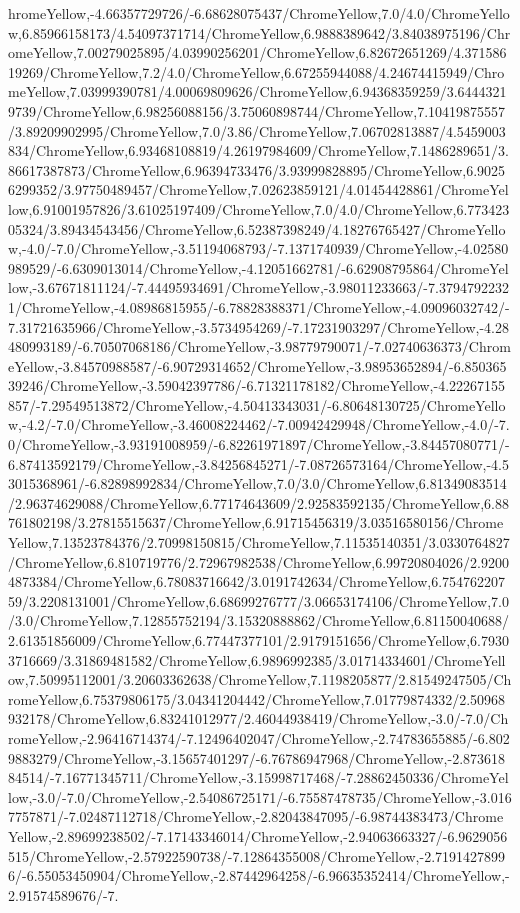 {\begin{tikzternal}
hromeYellow,-4.66357729726/-6.68628075437/ChromeYellow,7.0/4.0/ChromeYellow,6.85966158173/4.54097371714/ChromeYellow,6.9888389642/3.84038975196/ChromeYellow,7.00279025895/4.03990256201/ChromeYellow,6.82672651269/4.37158619269/ChromeYellow,7.2/4.0/ChromeYellow,6.67255944088/4.24674415949/ChromeYellow,7.03999390781/4.00069809626/ChromeYellow,6.94368359259/3.64443219739/ChromeYellow,6.98256088156/3.75060898744/ChromeYellow,7.10419875557/3.89209902995/ChromeYellow,7.0/3.86/ChromeYellow,7.06702813887/4.5459003834/ChromeYellow,6.93468108819/4.26197984609/ChromeYellow,7.1486289651/3.86617387873/ChromeYellow,6.96394733476/3.93999828895/ChromeYellow,6.90256299352/3.97750489457/ChromeYellow,7.02623859121/4.01454428861/ChromeYellow,6.91001957826/3.61025197409/ChromeYellow,7.0/4.0/ChromeYellow,6.77342305324/3.89434543456/ChromeYellow,6.52387398249/4.18276765427/ChromeYellow,-4.0/-7.0/ChromeYellow,-3.51194068793/-7.1371740939/ChromeYellow,-4.02580989529/-6.6309013014/ChromeYellow,-4.12051662781/-6.62908795864/ChromeYellow,-3.67671811124/-7.44495934691/ChromeYellow,-3.98011233663/-7.37947922321/ChromeYellow,-4.08986815955/-6.78828388371/ChromeYellow,-4.09096032742/-7.31721635966/ChromeYellow,-3.5734954269/-7.17231903297/ChromeYellow,-4.28480993189/-6.70507068186/ChromeYellow,-3.98779790071/-7.02740636373/ChromeYellow,-3.84570988587/-6.90729314652/ChromeYellow,-3.98953652894/-6.85036539246/ChromeYellow,-3.59042397786/-6.71321178182/ChromeYellow,-4.22267155857/-7.29549513872/ChromeYellow,-4.50413343031/-6.80648130725/ChromeYellow,-4.2/-7.0/ChromeYellow,-3.46008224462/-7.00942429948/ChromeYellow,-4.0/-7.0/ChromeYellow,-3.93191008959/-6.82261971897/ChromeYellow,-3.84457080771/-6.87413592179/ChromeYellow,-3.84256845271/-7.08726573164/ChromeYellow,-4.53015368961/-6.82898992834/ChromeYellow,7.0/3.0/ChromeYellow,6.81349083514/2.96374629088/ChromeYellow,6.77174643609/2.92583592135/ChromeYellow,6.88761802198/3.27815515637/ChromeYellow,6.91715456319/3.03516580156/ChromeYellow,7.13523784376/2.70998150815/ChromeYellow,7.11535140351/3.0330764827/ChromeYellow,6.810719776/2.72967982538/ChromeYellow,6.99720804026/2.92004873384/ChromeYellow,6.78083716642/3.0191742634/ChromeYellow,6.75476220759/3.2208131001/ChromeYellow,6.68699276777/3.06653174106/ChromeYellow,7.0/3.0/ChromeYellow,7.12855752194/3.15320888862/ChromeYellow,6.81150040688/2.61351856009/ChromeYellow,6.77447377101/2.9179151656/ChromeYellow,6.79303716669/3.31869481582/ChromeYellow,6.9896992385/3.01714334601/ChromeYellow,7.50995112001/3.20603362638/ChromeYellow,7.1198205877/2.81549247505/ChromeYellow,6.75379806175/3.04341204442/ChromeYellow,7.01779874332/2.50968932178/ChromeYellow,6.83241012977/2.46044938419/ChromeYellow,-3.0/-7.0/ChromeYellow,-2.96416714374/-7.12496402047/ChromeYellow,-2.74783655885/-6.8029883279/ChromeYellow,-3.15657401297/-6.76786947968/ChromeYellow,-2.87361884514/-7.16771345711/ChromeYellow,-3.15998717468/-7.28862450336/ChromeYellow,-3.0/-7.0/ChromeYellow,-2.54086725171/-6.75587478735/ChromeYellow,-3.0167757871/-7.02487112718/ChromeYellow,-2.82043847095/-6.98744383473/ChromeYellow,-2.89699238502/-7.17143346014/ChromeYellow,-2.94063663327/-6.9629056515/ChromeYellow,-2.57922590738/-7.12864355008/ChromeYellow,-2.71914278996/-6.55053450904/ChromeYellow,-2.87442964258/-6.96635352414/ChromeYellow,-2.91574589676/-7.
\end{tikzternal}}
